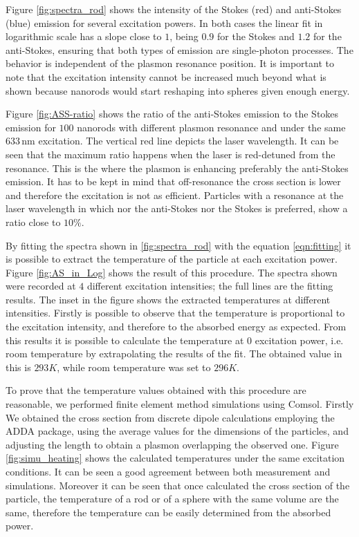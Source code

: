 \documentclass[journal=nalefd,manuscript=letter]{achemso}
\newcommand{\nm}{\ensuremath{\,\textrm{nm}}}
\begin{document}
Figure \ref{fig:spectra_rod} shows the intensity of the Stokes (red) and
anti-Stokes (blue) emission for several excitation powers. In both cases the
linear fit in logarithmic scale has a slope close to $1$, being $0.9$ for the
Stokes and $1.2$ for the anti-Stokes, ensuring that both types of emission are
single-photon processes. The behavior is independent of the plasmon resonance
position. It is important to note that the excitation intensity cannot be
increased much beyond what is shown because nanorods would start reshaping into
spheres given enough energy.

Figure \ref{fig:ASS-ratio} shows the ratio of the anti-Stokes emission to the
Stokes emission for $100$ nanorods with different plasmon resonance and under
the same $633\nm$ excitation. The vertical red line depicts the laser
wavelength. It can be seen that the maximum ratio happens when the laser is
red-detuned from the resonance. This is the where the plasmon is
enhancing preferably the anti-Stokes emission. It has to be kept in mind that
off-resonance the cross section is lower and therefore the excitation is not as
efficient. Particles with a resonance at the laser wavelength in which nor the
anti-Stokes nor the Stokes is preferred, show a ratio close to $10\%$.

By fitting the spectra shown in \ref{fig:spectra_rod} with the equation
\ref{eqn:fitting} it is possible to extract the temperature of the particle at
each excitation power. Figure \ref{fig:AS_in_Log} shows the result of this
procedure. The spectra shown were recorded at $4$ different excitation
intensities; the full lines are the fitting results. The inset in the figure
shows the extracted temperatures at different intensities. Firstly is
possible to observe that the temperature is proportional to the excitation
intensity, and therefore to the absorbed energy as expected. From this results
it is possible to calculate the temperature at $0$ excitation power, i.e.
room temperature by extrapolating the results of the fit. The obtained value
in this is $293K$, while room temperature was set to $296K$. 

To prove that the temperature values obtained with this procedure are
reasonable, we performed finite element method simulations using Comsol.
Firstly We obtained the cross section from discrete dipole calculations
employing the ADDA package, using the average values for the dimensions of the
particles, and adjusting the length to obtain a plasmon overlapping the observed
one. Figure \ref{fig:simu_heating} shows the calculated temperatures under the
same excitation conditions. It can be seen a good agreement between both
measurement and simulations. Moreover it can be seen that once calculated the
cross section of the particle, the temperature of a rod or of a sphere with the
same volume are the same, therefore the temperature can be easily determined
from the absorbed power.
\end{document}

